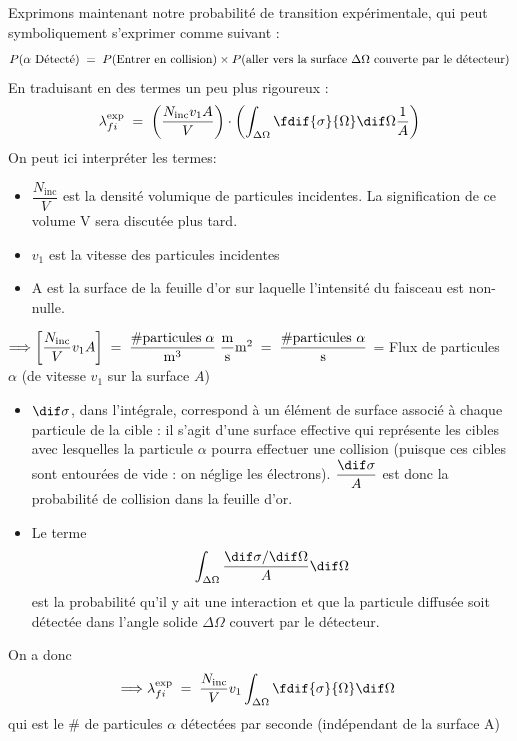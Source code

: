 Exprimons maintenant notre probabilité de transition expérimentale, qui peut symboliquement s'exprimer comme suivant :
\[
    P(\alpha\text{ Détecté}) \eq P(\text{Entrer en collision}) \times P(\text{aller vers la surface } \Delta \Omega \text{ couverte par le détecteur})
\]
En traduisant en des termes un peu plus rigoureux :
\begin{equation}
    \lambda_{fi}^\text{exp} \eq
    \left(   \dfrac{N_\text{inc} v_1 A}{V}   \right) \cdot
    \left(
    \int_{\Delta \Omega} \fdif{\sigma}{\Omega} \dif\Omega \dfrac{1}{A}
    \right)
    \label{lambda_exp}
\end{equation}
On peut ici interpréter les termes:
\begin{itemize}
    \item $\dfrac{N_\text{inc}}{V}$ est la densité volumique de particules incidentes. La signification de ce volume V sera discutée plus tard.
    \item $v_1$ est la vitesse des particules incidentes
    \item A est la surface de la feuille d'or sur laquelle l'intensité du faisceau est non-nulle.\\
\end{itemize}
$\Longrightarrow \left[\dfrac{N_\text{inc}}{V}v_1A\right] 
\eq 
\dfrac{\mbox{\#particules}\; \alpha}{\si{m^3}}\;\dfrac{\si{m}}{\si{s}}\si{m^2} 
\eq 
\dfrac{\mbox{\#particules}\ \alpha}{\si{s}}$  =  Flux de particules $\alpha$ (de vitesse $v_1$ sur la surface $A$)\\
    
\begin{itemize}
    \item $\dif\sigma$, dans l'intégrale, correspond à un élément de surface associé à chaque particule de la cible : il s'agit d'une surface effective qui représente les cibles avec lesquelles la particule $\alpha$ pourra effectuer une collision (puisque ces cibles sont entourées de vide : on néglige les électrons). $\dfrac{\dif\sigma}{A}$ est donc la probabilité de collision dans la feuille d'or.
    
    \item Le terme 
    \[
        \int_{\Delta \Omega} \dfrac{\dif\sigma/\dif\Omega}{A}\dif\Omega
    \] 
    est la probabilité qu'il y ait une interaction et que la particule diffusée soit détectée dans l'angle solide $\Delta \Omega$ couvert par le détecteur.\\
\end{itemize}
On a donc
\[
    \Longrightarrow \lambda^\text{exp}_{fi} \eq \dfrac{N_\text{inc}}{V}v_1\int_{\Delta \Omega}\fdif{\sigma}{\Omega}\dif\Omega \;  
\]
qui est le \# de particules $\alpha$ détectées par seconde (indépendant de la surface A)

